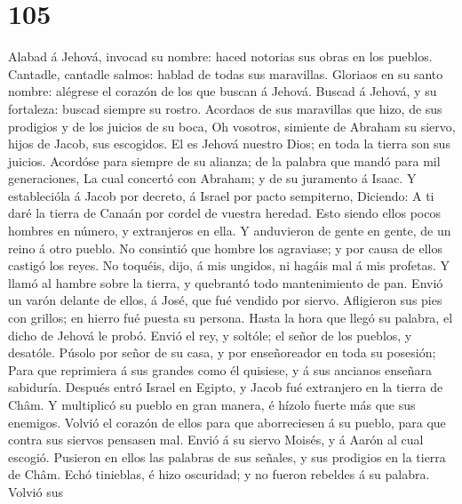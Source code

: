 \hypertarget{section-104}{%
\section{105}\label{section-104}}

 Alabad á Jehová, invocad su nombre: haced notorias sus
obras en los pueblos.  Cantadle, cantadle salmos: hablad de
todas sus maravillas.  Gloriaos en su santo nombre: alégrese
el corazón de los que buscan á Jehová.  Buscad á Jehová, y
su fortaleza: buscad siempre su rostro.  Acordaos de sus
maravillas que hizo, de sus prodigios y de los juicios de su boca,
 Oh vosotros, simiente de Abraham su siervo, hijos de Jacob,
sus escogidos.  El es Jehová nuestro Dios; en toda la tierra
son sus juicios.  Acordóse para siempre de su alianza; de la
palabra que mandó para mil generaciones,  La cual concertó
con Abraham; y de su juramento á Isaac.  Y establecióla á
Jacob por decreto, á Israel por pacto sempiterno, 
Diciendo: A ti daré la tierra de Canaán por cordel de vuestra heredad.
 Esto siendo ellos pocos hombres en número, y extranjeros
en ella.  Y anduvieron de gente en gente, de un reino á
otro pueblo.  No consintió que hombre los agraviase; y por
causa de ellos castigó los reyes.  No toquéis, dijo, á mis
ungidos, ni hagáis mal á mis profetas.  Y llamó al hambre
sobre la tierra, y quebrantó todo mantenimiento de pan. 
Envió un varón delante de ellos, á José, que fué vendido por siervo.
 Afligieron sus pies con grillos; en hierro fué puesta su
persona.  Hasta la hora que llegó su palabra, el dicho de
Jehová le probó.  Envió el rey, y soltóle; el señor de los
pueblos, y desatóle.  Púsolo por señor de su casa, y por
enseñoreador en toda su posesión;  Para que reprimiera á
sus grandes como él quisiese, y á sus ancianos enseñara sabiduría.
 Después entró Israel en Egipto, y Jacob fué extranjero en
la tierra de Châm.  Y multiplicó su pueblo en gran manera,
é hízolo fuerte más que sus enemigos.  Volvió el corazón de
ellos para que aborreciesen á su pueblo, para que contra sus siervos
pensasen mal.  Envió á su siervo Moisés, y á Aarón al cual
escogió.  Pusieron en ellos las palabras de sus señales, y
sus prodigios en la tierra de Châm.  Echó tinieblas, é hizo
oscuridad; y no fueron rebeldes á su palabra.  Volvió sus
